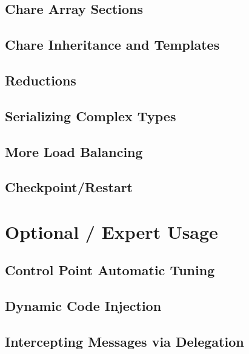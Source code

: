 \documentclass[10pt]{report}
\begin{document}
\chapter{Chare Array Sections}
\label{array section}
  

\chapter{Chare Inheritance and Templates}
\label{inheritance and templates}
  

\chapter{Reductions}
  
  

\chapter{Serializing Complex Types}
  

\chapter{More Load Balancing}
\label{advancedlb}
  

\chapter{Checkpoint/Restart}
\label{sec:checkpoint}
  

      
%  


\part{Optional / Expert Usage}

\chapter{Control Point Automatic Tuning}
\label{sec:controlpoint}
  

\chapter{Dynamic Code Injection}
\label{python}
  

\chapter{Intercepting Messages via Delegation}
\label{delegation}
  
\end{document}
